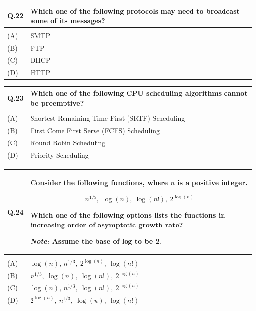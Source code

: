 \documentclass[14pt]{article}
\begin{document}
\vspace{0.3cm}

\begin{tabular}{|p{1.5cm}|p{12cm}|}
\hline
Q.22 & Which one of the following protocols may need to broadcast some of its messages? \\
\hline
& \\
\hline
(A) & SMTP \\
\hline
(B) & FTP \\
\hline
(C) & DHCP \\
\hline
(D) & HTTP \\
\hline
\end{tabular}

\vspace{0.3cm}

\begin{tabular}{|p{1.5cm}|p{12cm}|}
\hline
Q.23 & Which one of the following CPU scheduling algorithms \textbf{cannot} be preemptive? \\
\hline
& \\
\hline
(A) & Shortest Remaining Time First (SRTF) Scheduling \\
\hline
(B) & First Come First Serve (FCFS) Scheduling \\
\hline
(C) & Round Robin Scheduling \\
\hline
(D) & Priority Scheduling \\
\hline
\end{tabular}

\newpage

\begin{tabular}{|p{1.5cm}|p{12cm}|}
\hline
Q.24 &
\parbox[t]{\linewidth}{
Consider the following functions, where $n$ is a positive integer.

\[
n^{1/3},\ \log(n),\ \log(n!),\ 2^{\log(n)}
\]

Which one of the following options lists the functions in increasing order of asymptotic growth rate?

\vspace{0.2cm}

\textit{Note:} Assume the base of log to be 2.
}
\\
\hline
& \\
\hline
(A) & $\log(n),\ n^{1/3},\ 2^{\log(n)},\ \log(n!)$ \\
\hline
(B) & $n^{1/3},\ \log(n),\ \log(n!),\ 2^{\log(n)}$ \\
\hline
(C) & $\log(n),\ n^{1/3},\ \log(n!),\ 2^{\log(n)}$ \\
\hline
(D) & $2^{\log(n)},\ n^{1/3},\ \log(n),\ \log(n!)$ \\
\hline
\end{tabular}
\end{document}
